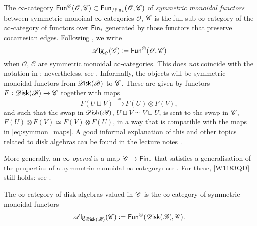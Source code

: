 \documentclass[../text]{subfiles}
\begin{document}
The $\infty$-category $\mathsf{Fun}^{\otimes}(\mathscr{O},\mathscr{C})\subset\mathsf{Fun}_{/\mathsf{Fin}_\ast}(\mathscr{O},\mathscr{C})$ of \emph{symmetric monoidal functors} between symmetric monoidal $\infty$-categories $\mathscr{O}$, $\mathscr{C}$ is the full sub-$\infty$-category of the $\infty$-category of functors over $\mathsf{Fin}_\ast$ generated by those functors that preserve cocartesian edges. Following \cite{aft_fhstrat}, we write 
\[
    \mathscr{A} \mathsf{lg}_{\mathscr{O}}(\mathscr{C})\coloneqq\mathsf{Fun}^{\otimes}(\mathscr{O},\mathscr{C})
\]
when $\mathscr{O}$, $\mathscr{C}$ are symmetric monoidal $\infty$-categories. This does \emph{not} coincide with the notation in \cite{lurie_ha}; nevertheless, see . Informally, the objects will be symmetric monoidal functors from $\disk(\bstr)$ to $\mathscr{C}$. These are given by functors $F:\disk(\bstr) \xrightarrow{} \catC$ together with maps
%
\begin{equation}\label{eq:symmon_maps}
    F(U \sqcup V) \xrightarrow{\ \ \simeq \ \ } F(U) \otimes F(V),
\end{equation}
%
and such that the swap in $\disk(\bstr)$, $U \sqcup V \simeq V \sqcup U$, is sent to the swap in $\mathscr{C}$, $F(U) \otimes F(V) \simeq F(V) \otimes F(U)$, in a way that is compatible with the maps in \eqref{eq:symmon_maps}. A good informal explanation of this and other topics related to disk algebras can be found in the lecture notes \cite{tanaka20}.

More generally, an \emph{$\infty$-operad} is a map $\mathscr{C}\to\mathsf{Fin}_\ast$ that satisfies a generalisation of the properties of a symmetric monoidal $\infty$-category: see \cite[Definition 2.1.1.10]{lurie_ha}. For these, \eqref{W1183QD} still holds: see \cite[Remark 2.1.1.14]{lurie_ha}.

\begin{definition}
    The $\infty$-category of disk algebras valued in $\mathscr{C}$ is the $\infty$-category of symmetric monoidal functors
    \begin{equation}
        \alg{\disk(\bstr)} (\catC) := \mathsf{Fun}^{\otimes}(\disk(\bstr), \catC).
    \end{equation}
\end{definition}


\end{document}
